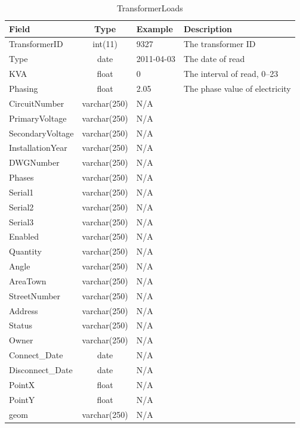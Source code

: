 \documentclass[a4paper,12pt]{llncs}
\begin{document}
\begin{table}[htp]
\centering
\caption{TransformerLoads}
\begin{tabular}{|l|c|l|p{8.5cm}|}
 \hline
 {\bf Field}       & {\bf Type} & {\bf Example}     & {\bf Description } \\ \hline
TransformerID    &int(11)      & 9327 &  The transformer ID \\ \hline
Type             &date         & 2011-04-03 &  The date of read  \\ \hline
KVA              &float        & 0 & The interval of read, 0--23  \\ \hline
Phasing          &float        & 2.05 & The phase value of electricity  \\ \hline
CircuitNumber    &varchar(250) & N/A &   \\ \hline
PrimaryVoltage   &varchar(250) & N/A &   \\ \hline
SecondaryVoltage &varchar(250) & N/A &   \\ \hline
InstallationYear &varchar(250) & N/A &   \\ \hline
DWGNumber        &varchar(250) & N/A &   \\ \hline
Phases           &varchar(250) & N/A &   \\ \hline
Serial1          &varchar(250) & N/A &   \\ \hline
Serial2          &varchar(250) & N/A &   \\ \hline
Serial3          &varchar(250) & N/A &   \\ \hline
Enabled          &varchar(250) & N/A &   \\ \hline
Quantity         &varchar(250) & N/A &   \\ \hline
Angle            &varchar(250) & N/A &   \\ \hline
AreaTown         &varchar(250) & N/A &   \\ \hline
StreetNumber     &varchar(250) & N/A &   \\ \hline
Address          &varchar(250) & N/A &   \\ \hline
Status           &varchar(250) & N/A &   \\ \hline
Owner            &varchar(250) & N/A &   \\ \hline
Connect\_Date     &date         & N/A &   \\ \hline
Disconnect\_Date  &date         & N/A &   \\ \hline
PointX           &float        &N/A  &   \\ \hline
PointY           &float        & N/A &   \\ \hline
geom             &varchar(250) & N/A &   \\ \hline
\end{tabular}
\end{table}
\end{document}
